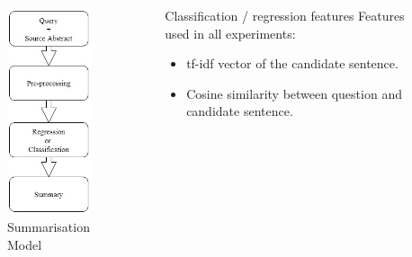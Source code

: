 \documentclass[final]{beamer}
\newlength{\sepwid}
\newlength{\onecolwid}
\begin{document}
\begin{frame}[t]
\begin{columns}[t]
\begin{column}{\onecolwid}
\begin{figure}
\includegraphics[width=0.5\linewidth]{model.png}
\caption{Summarisation Model\label{fig:model}}
\end{figure}


\end{column} %

\begin{column}{\sepwid}\end{column} %

\begin{column}{\onecolwid} %


\begin{block}{Classification / regression features}
Features used in all experiments:
\begin{itemize}
\item tf-idf vector of the candidate sentence.
\item Cosine similarity between question and candidate sentence.
\end{itemize}
\end{block}


\end{column}
\end{columns}
\end{frame}
\end{document}
